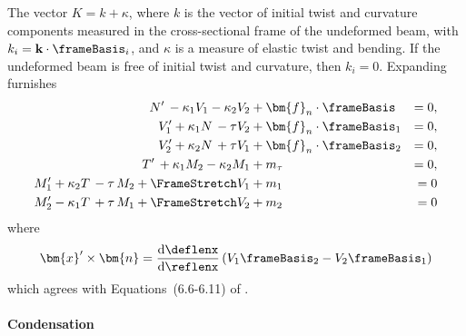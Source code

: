 The vector $K=k+\kappa$, where $k$ is the vector of initial twist and curvature components measured in the cross-sectional frame of the undeformed beam, with $k_i=\mathbf{k} \cdot \frameBasis_i$, and $\kappa$ is a measure of elastic twist and bending. 
If the undeformed beam is free of initial twist and curvature, then $k_i=0$.
%
Expanding furnishes
\begin{equation}
\begin{aligned}
N^{\prime}\,-\kappa_1 V_1-\kappa_2 V_2&+\bm{f}_n \cdot \frameBasis\,&=0, \\
V_1^{\prime}+\kappa_1 N\, -    \tau V_2&+\bm{f}_n \cdot \frameBasis_1&=0, \\
V_2^{\prime}+\kappa_2 N\, +    \tau V_1&+\bm{f}_n \cdot \frameBasis_2&=0, \\
T^{\prime}\,+\kappa_1 M_2-\kappa_2 M_1&+m_{\tau}&=0, \\
M_1^{\prime}+\kappa_2 T \,-  \tau\, M_2+ \FrameStretch V_1&+m_1&=0 \\
M_2^{\prime}-\kappa_1 T \,+  \tau\, M_1+ \FrameStretch V_2&+m_2&=0
\end{aligned}
\end{equation}
where 
\begin{equation*}
\bm{x}^{\prime} \times \bm{n} 
= \frac{\mathrm{d} \deflenx}{\mathrm{d} \reflenx} \left(V_1 \frameBasis_2 - V_2 \frameBasis_1\right)
\end{equation*}
which agrees with Equations~(6.6-6.11) of \textcite{dill1992kirchhoffs}.

\paragraph{Condensation}

